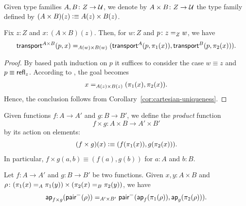 \begin{ntn}
    Given type families\/ $A,B \colon Z\to\univ$, we denote by\/ $A\times B\colon Z\to\univ$ the type family defined by\/ $(A\times B)(z)\mathrel{\vcentcolon}\equiv A(z)\times B(z)$.
\end{ntn}

\begin{thm}
    Fix $z\colon Z$ and $x\colon(A\times B)(z)$. Then, for $w\colon Z$ and $p\colon z\eq Zw$, we have
    \[
        \mathsf{transport}^{A\times B}(p, x) \mathrel{=_{A(w)\times B(w)}}
        (\mathsf{transport}^A(p, \pi_1(x)), \mathsf{transport}^B
            (p, \pi_2(x))).
    \]
\end{thm}

\begin{proof}
    By based path induction on $p$ it suffices to consider the case $w\equiv z$ and $p\equiv\mathsf{refl}_z$. According to , the goal becomes
    \begin{align*}
        x\mathrel{=_{A(z)\times B(z)}}(\pi_1(x),\pi_2(x)).
    \end{align*}
    Hence, the conclusion follows from Corollary~\ref{cor:cartesian-uniqueness}.
    
\end{proof}



\begin{defn}
    Given functions\/ $f\colon A \to A'$ and\/ $g\colon B \to B'$, we define the \textsl{product} function
    \[
        f\times g\colon A\times B\to A'\times B'
    \]
    by its action on elements:
    \[
        (f\times g)(x)\mathrel{\vcentcolon}\equiv(f(\pi_1(x)),g(\pi_2(x))).
    \]
    In particular, $f\times g(a,b)\equiv (f(a),g(b))$ for $a\colon A$ and $b\colon B$.
\end{defn}

\begin{thm}\label{thm:pair-fxg}
    Let\/ $f\colon A\to A'$ and\/ $g\colon B\to B'$ be two functions.
    Given\/ $x,y\colon A\times B$ and\/ $\rho\colon(\pi_1(x)\eq A\pi_1(y))\times(\pi_2(x)\eq B\pi_2(y))$, we have
    \[
        \mathsf{ap}_{f\times g}(\mathsf{pair}^{\mathrel{=_{}}}(\rho))
        \mathrel{=_{A'\times B'}}
        \mathsf{pair}^{\mathrel{=_{}}}(\mathsf{ap}_f(\pi_1(\rho)),\mathsf{ap}_g(\pi_2(\rho))).
    \]
\end{thm}

